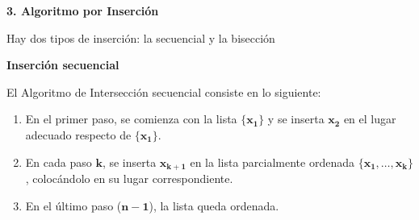 \documentclass[twoside]{report}
\newcommand{\bs}[1]{\boldsymbol{#1}}
\begin{document}
\textbf{3. Algoritmo por Inserción}
\vspace*{0.2cm}

Hay dos tipos de inserción: la secuencial y la bisección
\vspace{0.5cm}

\textbf{Inserción secuencial}
\vspace{0.2cm}

 El Algoritmo de Intersección secuencial consiste en lo siguiente:

        \begin{enumerate}
            \item En el primer paso, se comienza con la lista $\bs{\{x_1\}}$ y se inserta $\bs{x_2}$ en el lugar adecuado respecto de $\bs{\{x_1\}}$.
            \item En cada paso $\bs{k}$, se inserta $\bs{x_{k+1}}$ en la lista parcialmente ordenada $\bs{\{x_1,\ldots,x_k\}}$, colocándolo en su lugar correspondiente.
            \item En el último paso ($\bs{n-1}$), la lista queda ordenada.
        \end{enumerate}

 \vspace{0.6cm}
%
%
%
%
%
%
%
%


\vspace{0.5cm}
\end{document}

